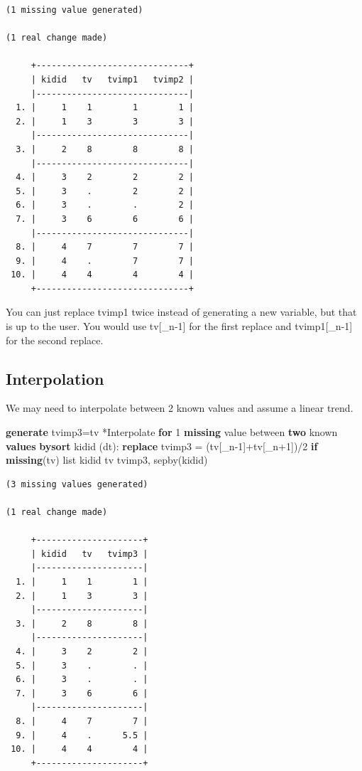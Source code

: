 \documentclass[
]{book}
\newenvironment{Shaded}{\begin{snugshade}}{\end{snugshade}}
\newcommand{\DataTypeTok}[1]{\textcolor[rgb]{0.13,0.29,0.53}{#1}}
\newcommand{\FunctionTok}[1]{\textcolor[rgb]{0.13,0.29,0.53}{\textbf{#1}}}
\newcommand{\KeywordTok}[1]{\textcolor[rgb]{0.13,0.29,0.53}{\textbf{#1}}}
\newcommand{\NormalTok}[1]{#1}
\newcommand{\OtherTok}[1]{\textcolor[rgb]{0.56,0.35,0.01}{#1}}
\begin{document}
\begin{verbatim}
(1 missing value generated)

(1 real change made)

     +------------------------------+
     | kidid   tv   tvimp1   tvimp2 |
     |------------------------------|
  1. |     1    1        1        1 |
  2. |     1    3        3        3 |
     |------------------------------|
  3. |     2    8        8        8 |
     |------------------------------|
  4. |     3    2        2        2 |
  5. |     3    .        2        2 |
  6. |     3    .        .        2 |
  7. |     3    6        6        6 |
     |------------------------------|
  8. |     4    7        7        7 |
  9. |     4    .        7        7 |
 10. |     4    4        4        4 |
     +------------------------------+
\end{verbatim}

You can just replace tvimp1 twice instead of generating a new variable, but
that is up to the user. You would use tv{[}\_n-1{]} for the first replace and
tvimp1{[}\_n-1{]} for the second replace.

\subsection*{Interpolation}\label{interpolation}

We may need to interpolate between 2 known values and assume a linear trend.

\begin{Shaded}
\begin{Highlighting}[]
\KeywordTok{generate}\NormalTok{ tvimp3=tv}
\NormalTok{*Interpolate }\KeywordTok{for}\NormalTok{ 1 }\FunctionTok{missing} \OtherTok{value}\NormalTok{ between }\KeywordTok{two}\NormalTok{ known }\KeywordTok{values}
\KeywordTok{bysort}\NormalTok{ kidid (dt): }\KeywordTok{replace}\NormalTok{ tvimp3 = (tv[}\DataTypeTok{\_n}\NormalTok{{-}1]+tv[}\DataTypeTok{\_n}\NormalTok{+1])/2 }\KeywordTok{if} \FunctionTok{missing}\NormalTok{(tv)}
\OtherTok{list}\NormalTok{ kidid tv tvimp3, sepby(kidid)}
\end{Highlighting}
\end{Shaded}

\begin{verbatim}
(3 missing values generated)

(1 real change made)

     +---------------------+
     | kidid   tv   tvimp3 |
     |---------------------|
  1. |     1    1        1 |
  2. |     1    3        3 |
     |---------------------|
  3. |     2    8        8 |
     |---------------------|
  4. |     3    2        2 |
  5. |     3    .        . |
  6. |     3    .        . |
  7. |     3    6        6 |
     |---------------------|
  8. |     4    7        7 |
  9. |     4    .      5.5 |
 10. |     4    4        4 |
     +---------------------+
\end{verbatim}
\end{document}
